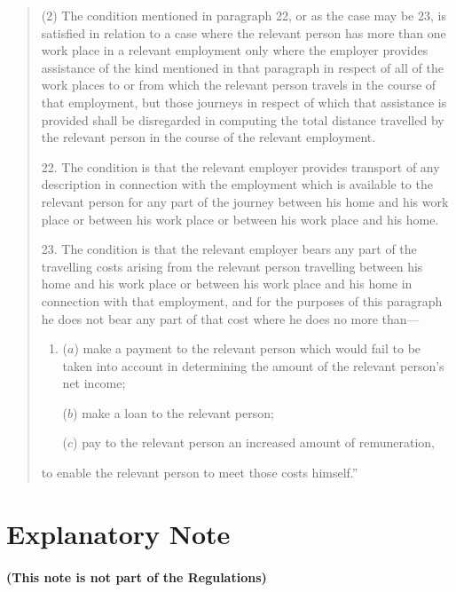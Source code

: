 \documentclass[a4paper]{article}
\newcommand{\parthead}{}
\begin{document}
\begin{quotation}
(2) The condition mentioned in paragraph 22, or as the case may be 23, is satisfied in relation to a case where the relevant person has more than one work place in a relevant employment only where the employer provides assistance of the kind mentioned in that paragraph in respect of all of the work places to or from which the relevant person travels in the course of that employment, but those journeys in respect of which that assistance is provided shall be disregarded in computing the total distance travelled by the relevant person in the course of the relevant employment.

\medskip

22.  The condition is that the relevant employer provides transport of any description in connection with the employment which is available to the relevant person for any part of the journey between his home and his work place or between his work place or between his work place and his home.

\medskip

23.  The condition is that the relevant employer bears any part of the travelling costs arising from the relevant person travelling between his home and his work place or between his work place and his home in connection with that employment, and for the purposes of this paragraph he does not bear any part of that cost where he does no more than—
\begin{enumerate}\item[]
($a$) make a payment to the relevant person which would fail to be taken into account in determining the amount of the relevant person’s net income;

($b$) make a loan to the relevant person;

($c$) pay to the relevant person an increased amount of remuneration,
\end{enumerate}
to enable the relevant person to meet those costs himself.''
\end{quotation}

\part{Explanatory Note}

\renewcommand\parthead{--- Explanatory Note}

\subsection*{(This note is not part of the Regulations)}
\end{document}
